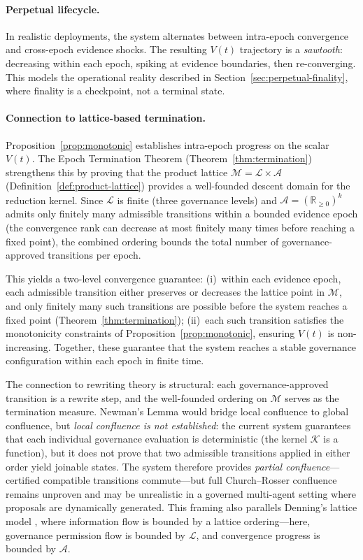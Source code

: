 \documentclass[11pt]{article}
\begin{document}
\paragraph{Perpetual lifecycle.} In realistic deployments, the system alternates between intra-epoch convergence and cross-epoch evidence shocks. The resulting $V(t)$ trajectory is a \emph{sawtooth}: decreasing within each epoch, spiking at evidence boundaries, then re-converging. This models the operational reality described in Section~\ref{sec:perpetual-finality}, where finality is a checkpoint, not a terminal state.

\paragraph{Connection to lattice-based termination.} Proposition~\ref{prop:monotonic} establishes intra-epoch progress on the scalar $V(t)$. The Epoch Termination Theorem (Theorem~\ref{thm:termination}) strengthens this by proving that the product lattice $\mathcal{M} = \mathcal{L} \times \mathcal{A}$ (Definition~\ref{def:product-lattice}) provides a well-founded descent domain for the reduction kernel. Since $\mathcal{L}$ is finite (three governance levels) and $\mathcal{A} = (\mathbb{R}_{\geq 0})^k$ admits only finitely many admissible transitions within a bounded evidence epoch (the convergence rank can decrease at most finitely many times before reaching a fixed point), the combined ordering bounds the total number of governance-approved transitions per epoch.

This yields a two-level convergence guarantee: (i)~within each evidence epoch, each admissible transition either preserves or decreases the lattice point in $\mathcal{M}$, and only finitely many such transitions are possible before the system reaches a fixed point (Theorem~\ref{thm:termination}); (ii)~each such transition satisfies the monotonicity constraints of Proposition~\ref{prop:monotonic}, ensuring $V(t)$ is non-increasing. Together, these guarantee that the system reaches a stable governance configuration within each epoch in finite time.

The connection to rewriting theory \cite{baader1998} is structural: each governance-approved transition is a rewrite step, and the well-founded ordering on $\mathcal{M}$ serves as the termination measure. Newman's Lemma \cite{newman1942} would bridge local confluence to global confluence, but \emph{local confluence is not established}: the current system guarantees that each individual governance evaluation is deterministic (the kernel $\mathcal{K}$ is a function), but it does not prove that two admissible transitions applied in either order yield joinable states. The system therefore provides \emph{partial confluence}---certified compatible transitions commute---but full Church--Rosser confluence remains unproven and may be unrealistic in a governed multi-agent setting where proposals are dynamically generated. This framing also parallels Denning's lattice model \cite{denning1976}, where information flow is bounded by a lattice ordering---here, governance permission flow is bounded by $\mathcal{L}$, and convergence progress is bounded by $\mathcal{A}$.
\end{document}

